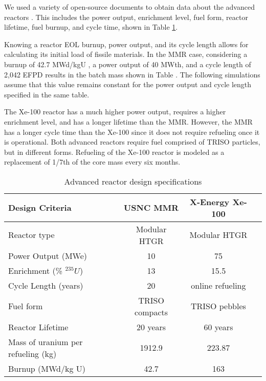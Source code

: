 We used a variety of open-source documents to obtain data about the advanced reactors
\cite{mitchell_usnc_2020, hawari_development_2018, venneri_neutronic_2015, 
harlan_x-energy_2018, hussain_advances_2018}. 
This includes 
the power output, enrichment level, fuel form, reactor lifetime, fuel 
burnup, and cycle time, shown in Table \ref{tab:reactor_summary}. 

Knowing a reactor \gls{EOL} burnup, power output, and its cycle length
allows for calculating its initial load of fissile materials.
In the MMR case, considering a burnup of 42.7 MWd/kgU \cite{hawari_development_2018},
a power output of 40 MWth, and a cycle length of 2,042 EFPD \cite{venneri_neutronic_2015}
results in the batch mass shown in Table \label{tab:reactor_summary}.
The following simulations assume that this value remains constant for the
power output and cycle length specified in the same table.

The Xe-100 reactor has a much higher power output, requires a higher enrichment 
level, and has a longer lifetime than the \gls{MMR}. However, the 
\gls{MMR} has a longer cycle time than the Xe-100 since it does not require 
refueling once it is operational. Both advanced reactors require fuel 
comprised of \gls{TRISO} particles, but in different forms. Refueling 
of the Xe-100 reactor is modeled as a replacement of 1/7th of the core mass 
every six months.  

\begin{table}[ht]
        \caption{Advanced reactor design specifications}
        \label{tab:reactor_summary}
        \begin{tabular}{l c c c}
            \hline
            Design Criteria & \gls{USNC} \gls{MMR} \cite{mitchell_usnc_2020}& 
                X-Energy Xe-100 \cite{harlan_x-energy_2018,hussain_advances_2018} \\\hline
            Reactor type & Modular HTGR & Modular HTGR \\
            Power Output (MWe) & 10 & 75 \\
            Enrichment (\% $^{235}U$) & 13 & 15.5 \\
            Cycle Length (years) & 20 & online refueling\\
            Fuel form & \gls{TRISO} compacts & \gls{TRISO} pebbles\\
            Reactor Lifetime & 20 years & 60 years \\
            Mass of uranium per refueling (kg) & 1912.9 & 223.87 \\
            Burnup (MWd/kg U) & 42.7 & 163 \\
            \hline
        \end{tabular}
    \end{table}

